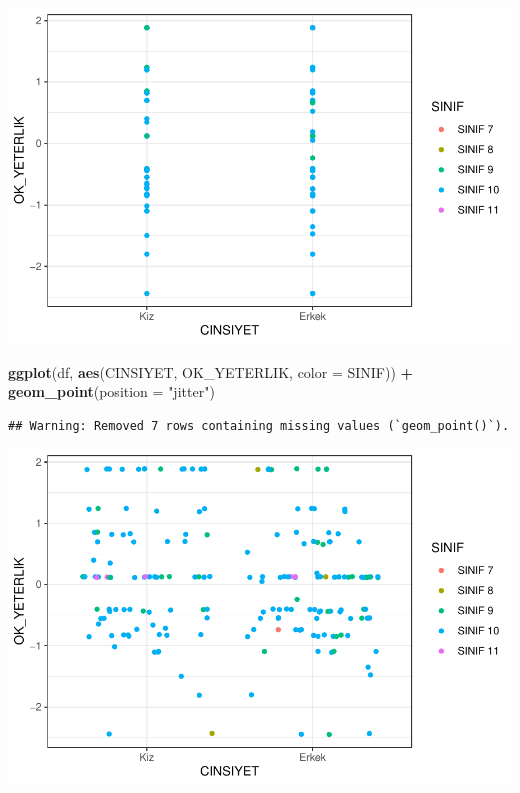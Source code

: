 \documentclass[
  oneside]{book}
\newenvironment{Shaded}{\begin{snugshade}}{\end{snugshade}}
\newcommand{\AttributeTok}[1]{\textcolor[rgb]{0.13,0.29,0.53}{#1}}
\newcommand{\FunctionTok}[1]{\textcolor[rgb]{0.13,0.29,0.53}{\textbf{#1}}}
\newcommand{\NormalTok}[1]{#1}
\newcommand{\SpecialCharTok}[1]{\textcolor[rgb]{0.81,0.36,0.00}{\textbf{#1}}}
\newcommand{\StringTok}[1]{\textcolor[rgb]{0.31,0.60,0.02}{#1}}
\begin{document}
\begin{center}\includegraphics[width=1\linewidth]{15-betimleyici-istatistik_files/figure-latex/unnamed-chunk-43-1} \end{center}

\begin{Shaded}
\begin{Highlighting}[]
\FunctionTok{ggplot}\NormalTok{(df, }\FunctionTok{aes}\NormalTok{(CINSIYET, OK\_YETERLIK, }\AttributeTok{color =}\NormalTok{ SINIF)) }\SpecialCharTok{+}
  \FunctionTok{geom\_point}\NormalTok{(}\AttributeTok{position =} \StringTok{"jitter"}\NormalTok{)}
\end{Highlighting}
\end{Shaded}

\begin{verbatim}
## Warning: Removed 7 rows containing missing values (`geom_point()`).
\end{verbatim}

\begin{center}\includegraphics[width=1\linewidth]{15-betimleyici-istatistik_files/figure-latex/unnamed-chunk-44-1} \end{center}
\end{document}
